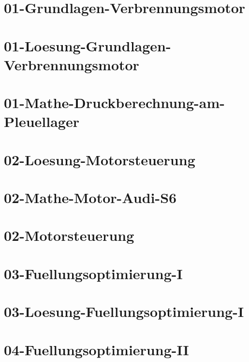 



\chapter{01-Grundlagen-Verbrennungsmotor}
%
\chapter{01-Loesung-Grundlagen-Verbrennungsmotor}
%
\chapter{01-Mathe-Druckberechnung-am-Pleuellager}
%
\chapter{02-Loesung-Motorsteuerung}
%
\chapter{02-Mathe-Motor-Audi-S6}
%
\chapter{02-Motorsteuerung}
%
\chapter{03-Fuellungsoptimierung-I}
%
\chapter{03-Loesung-Fuellungsoptimierung-I}
%
\chapter{04-Fuellungsoptimierung-II}
%

